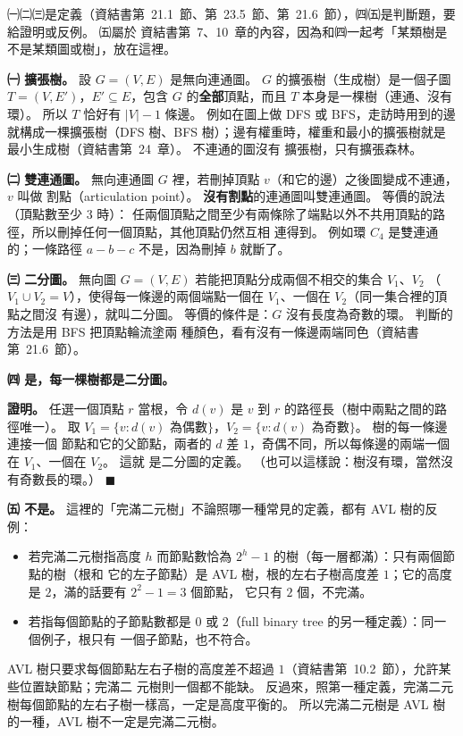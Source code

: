 \begin{pastsoln}
㈠㈡㈢是定義（資結書第~21.1~節、第~23.5~節、第~21.6~節），㈣㈤是判斷題，要給證明或反例。 ㈤屬於
資結書第~7、10~章的內容，因為和㈣一起考「某類樹是不是某類圖或樹」，放在這裡。

\textbf{㈠ 擴張樹。} 設 $G = (V, E)$ 是無向連通圖。 $G$ 的擴張樹（生成樹）是一個子圖
$T = (V, E')$，$E' \subseteq E$，包含 $G$ 的\textbf{全部}頂點，而且 $T$ 本身是一棵樹（連通、沒有環）。
所以 $T$ 恰好有 $|V| - 1$ 條邊。 例如在圖上做 DFS 或 BFS，走訪時用到的邊就構成一棵擴張樹（DFS
樹、BFS 樹）；邊有權重時，權重和最小的擴張樹就是最小生成樹（資結書第~24~章）。 不連通的圖沒有
擴張樹，只有擴張森林。

\textbf{㈡ 雙連通圖。} 無向連通圖 $G$ 裡，若刪掉頂點 $v$（和它的邊）之後圖變成不連通，$v$ 叫做
割點（articulation point）。 \textbf{沒有割點}的連通圖叫雙連通圖。 等價的說法（頂點數至少 $3$ 時）：
任兩個頂點之間至少有兩條除了端點以外不共用頂點的路徑，所以刪掉任何一個頂點，其他頂點仍然互相
連得到。 例如環 $C_4$ 是雙連通的；一條路徑 $a - b - c$ 不是，因為刪掉 $b$ 就斷了。

\textbf{㈢ 二分圖。} 無向圖 $G = (V, E)$ 若能把頂點分成兩個不相交的集合 $V_1$、$V_2$
（$V_1 \cup V_2 = V$），使得每一條邊的兩個端點一個在 $V_1$、一個在 $V_2$（同一集合裡的頂點之間沒
有邊），就叫二分圖。 等價的條件是：$G$ 沒有長度為奇數的環。 判斷的方法是用 BFS 把頂點輪流塗兩
種顏色，看有沒有一條邊兩端同色（資結書第~21.6~節）。

\textbf{㈣ 是，每一棵樹都是二分圖。}

\textbf{證明。} 任選一個頂點 $r$ 當根，令 $d(v)$ 是 $v$ 到 $r$ 的路徑長（樹中兩點之間的路徑唯一）。
取 $V_1 = \{v : d(v) \text{ 為偶數}\}$，$V_2 = \{v : d(v) \text{ 為奇數}\}$。 樹的每一條邊連接一個
節點和它的父節點，兩者的 $d$ 差 $1$，奇偶不同，所以每條邊的兩端一個在 $V_1$、一個在 $V_2$。 這就
是二分圖的定義。 （也可以這樣說：樹沒有環，當然沒有奇數長的環。）
\hfill$\blacksquare$

\textbf{㈤ 不是。} 這裡的「完滿二元樹」不論照哪一種常見的定義，都有 AVL 樹的反例：
\begin{itemize}
\item 若完滿二元樹指高度 $h$ 而節點數恰為 $2^h - 1$ 的樹（每一層都滿）：只有兩個節點的樹（根和
它的左子節點）是 AVL 樹，根的左右子樹高度差 $1$；它的高度是 $2$，滿的話要有 $2^2 - 1 = 3$ 個節點，
它只有 $2$ 個，不完滿。
\item 若指每個節點的子節點數都是 $0$ 或 $2$（full binary tree 的另一種定義）：同一個例子，根只有
一個子節點，也不符合。
\end{itemize}
\begin{center}
\end{center}
AVL 樹只要求每個節點左右子樹的高度差不超過 $1$（資結書第~10.2~節），允許某些位置缺節點；完滿二
元樹則一個都不能缺。 反過來，照第一種定義，完滿二元樹每個節點的左右子樹一樣高，一定是高度平衡的。
所以完滿二元樹是 AVL 樹的一種，AVL 樹不一定是完滿二元樹。
\end{pastsoln}
